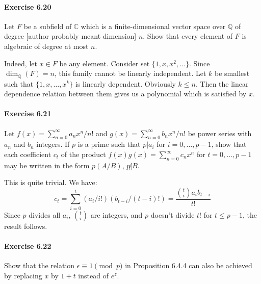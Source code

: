 \documentclass[notitlepage]{article}
\theoremstyle{definition}
\newcommand\C{\mathbb{C}}
\newcommand\Q{\mathbb{Q}}
\begin{document}
\paragraph{Exercise 6.20}
Let $F$ be a subfield of $\C$ which is a finite-dimensional vector
space over $\Q$ of degree [author probably meant dimension] $n$. Show
that every element of $F$ is algebraic of degree at most $n$.

Indeed, let $x \in F$ be any element. Consider set $\{1, x, x^2,
\ldots\}$. Since $\dim_\Q(F) = n$, this family cannot be linearly
independent. Let $k$ be smallest such that $\{1, x, \ldots, x^k\}$ is
linearly dependent. Obviously $k \leq n$. Then the linear dependence
relation between them gives us a polynomial which is satisfied by $x$.

\paragraph{Exercise 6.21}
Let $f(x) = \sum_{n=0}^\infty a_n x^n/n!$ and $g(x) =
\sum_{n=0}^\infty b_n x^n/n!$ be power series with $a_n$ and $b_n$
integers. If $p$ is a prime such that $p|a_i$ for $i = 0, \ldots,
p-1$, show that each coefficient $c_t$ of the product $f(x)g(x) =
\sum_{n=0}^\infty c_n x^n$ for $t = 0, \ldots, p-1$ may be written in
the form $p(A/B)$, $p\not | B$.

This is quite trivial. We have:
\begin{equation}
c_t = \sum_{i=0}^t (a_i/i!)(b_{t-i}/(t-i)!) = \frac{{t \choose i} a_i b_{t-i}}{t!}
\end{equation}
Since $p$ divides all $a_i$, ${t\choose i}$ are integers, and $p$
doesn't divide $t!$ for $t \leq p-1$, the result follows.

\paragraph{Exercise 6.22}
Show that the relation $\epsilon \equiv 1 \pmod p$ in Proposition
6.4.4 can also be achieved by replacing $x$ by $1+t$ instead of $e^z$.
\end{document}
